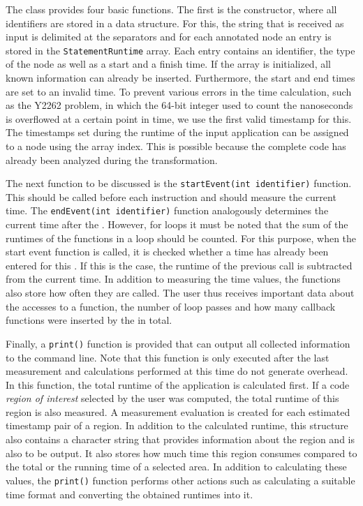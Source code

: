 The \DATA class provides four basic functions. The first is the constructor, where all identifiers are stored in a data structure. For this, the string that is received as input is delimited at the separators and for each annotated node an entry is stored in the \lstinline{StatementRuntime} array. Each entry contains an identifier, the type of the node as well as a start and a finish time. If the array is initialized, all known information can already be inserted. Furthermore, the start and end times are set to an invalid time. To prevent various errors in the time calculation, such as the Y2262 problem, in which the 64-bit integer used to count the nanoseconds is overflowed at a certain point in time, we use the first valid timestamp for this. The timestamps set during the runtime of the input application can be assigned to a node using the array index. This is possible because the complete code has already been analyzed during the \SOUTOSOU transformation. 

The next function to be discussed is the \lstinline{startEvent(int identifier)} function. This should be called before each instruction and should measure the current time. The \lstinline{endEvent(int identifier)} function analogously determines the current time after the \STAT. However, for loops it must be noted that the sum of the runtimes of the functions in a loop should be counted. For this purpose, when the start event function is called, it is checked whether a time has already been entered for this \STAT. If this is the case, the runtime of the previous call is subtracted from the current time. In addition to measuring the time values, the functions also store how often they are called. The user thus receives important data about the accesses to a function, the number of loop passes and how many callback functions were inserted by the \TOOL in total. 

Finally, a \lstinline{print()} function is provided that can output all collected information to the command line. Note that this function is only executed after the last measurement and calculations performed at this time do not generate overhead. In this function, the total runtime of the application is calculated first. If a code \emph{region of interest} selected by the user was computed, the total runtime of this region is also measured. A measurement evaluation is created for each estimated timestamp pair of a region. In addition to the calculated runtime, this structure also contains a character string that provides information about the region and is also to be output. It also stores how much time this region consumes compared to the total or the running time of a selected area. In addition to calculating these values, the \lstinline{print()} function performs other actions such as calculating a suitable time format and converting the obtained runtimes into it. 

